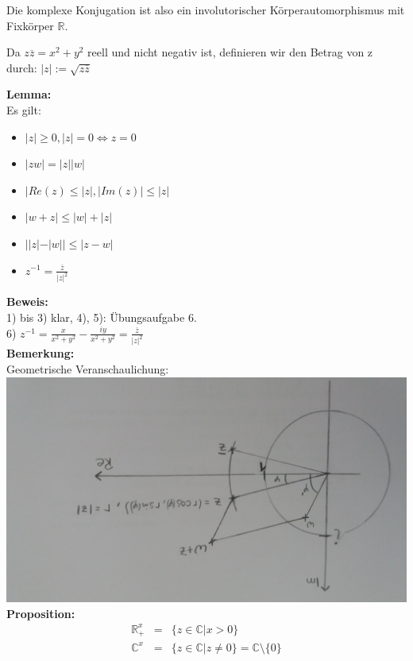 Die komplexe Konjugation ist also ein involutorischer Körperautomorphismus mit Fixkörper $\mathds{R}$.\\
\begin{defi}
	Da $z\overline{z} = x^2+y^2$ reell und nicht negativ ist, definieren wir den Betrag von z durch: $|z|:= \sqrt{z\overline{z}}$
\end{defi}

\textbf{Lemma: }\\
Es gilt:
\begin{itemize}
	\item
	$|z| \geq 0, |z| = 0 \Leftrightarrow z = 0$
	\item
	$|zw| = |z||w|$
	\item
	$|Re(z) \leq |z|, |Im(z)| \leq |z|$
	\item
	 $|w+z| \leq |w|+|z|$
	 \item
	 $||z|-|w|| \leq |z-w|$
	 \item
	 $z^{-1} = \frac{\overline{z}}{|z|^2}$
\end{itemize}
\textbf{Beweis: }\\
1) bis 3) klar, 4), 5): Übungsaufgabe 6.\\
6) $z^{-1} =  \frac{x}{x^2 +y^2}- \frac{iy}{x^2+y^2} = \frac{\overline{z}}{|z|^2}$\\

\textbf{Bemerkung:}\\
Geometrische Veranschaulichung: \\
\includegraphics[scale=0.1, angle=180]{pics/Polar.jpg} \\

\textbf{Proposition: }\\
\begin{eqnarray*}
\mathds{R}^x_+ &=& \{z \in \mathds{C}| x > 0\} \\
\mathds{C}^x &=& \{ z \in \mathds{C} | z \neq 0\} =  \mathds{C} \setminus\{0\} 
\end{eqnarray*}

